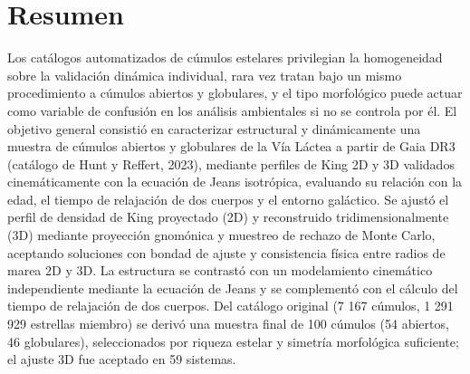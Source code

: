 
\chapter*{Resumen}

    Los catálogos automatizados de cúmulos estelares privilegian la homogeneidad 
    sobre la validación dinámica individual, rara vez tratan bajo un mismo 
    procedimiento a cúmulos abiertos y globulares, y el tipo morfológico puede 
    actuar como variable de confusión en los análisis ambientales si no se 
    controla por él. El objetivo general consistió en caracterizar estructural y 
    dinámicamente una muestra de cúmulos abiertos y globulares de la Vía Láctea 
    a partir de Gaia DR3 (catálogo de Hunt y Reffert, 2023), mediante perfiles 
    de King 2D y 3D validados cinemáticamente con la ecuación de Jeans 
    isotrópica, evaluando su relación con la edad, el tiempo de relajación de 
    dos cuerpos y el entorno galáctico. Se ajustó el perfil de densidad de King 
    proyectado (2D) y reconstruido tridimensionalmente (3D) mediante proyección 
    gnomónica y muestreo de rechazo de Monte Carlo, aceptando soluciones con 
    bondad de ajuste y consistencia física entre radios de marea 2D y 3D. La 
    estructura se contrastó con un modelamiento cinemático independiente 
    mediante la ecuación de Jeans y se complementó con el cálculo del tiempo de 
    relajación de dos cuerpos. Del catálogo original (7 167 cúmulos, 1 291 929 
    estrellas miembro) se derivó una muestra final de 100 cúmulos (54 abiertos, 
    46 globulares), seleccionados por riqueza estelar y simetría morfológica 
    suficiente; el ajuste 3D fue aceptado en 59 sistemas.

